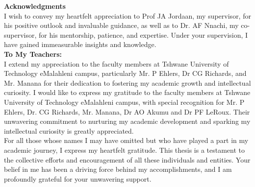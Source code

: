 \textbf{Acknowledgments}
\vspace{0.2cm}
\\I wish to convey my heartfelt appreciation to Prof JA Jordaan, my supervisor, for his positive outlook and invaluable guidance, as well as to Dr. AF Nnachi, my co-supervisor, for his mentorship, patience, and expertise. Under your supervision, I have gained immeasurable insights and knowledge.
\vspace{0.2cm}
\textbf{\\To My Teachers:} 
\vspace{0.2cm}
\\I extend my appreciation to the faculty members at Tshwane University of Technology eMalahleni campus, particularly Mr. P Ehlers, Dr CG Richards, and Mr. Manana for their dedication to fostering my academic growth and intellectual curiosity.
I would like to express my gratitude to the faculty members at Tshwane University of Technology eMalahleni campus, with special recognition for Mr. P Ehlers, Dr. CG Richards, Mr. Manana, Dr AO Akumu and Dr PF LeRoux. Their unwavering commitment to nurturing my academic development and sparking my intellectual curiosity is greatly appreciated.
\vspace{0.2cm}
\\For all those whose names I may have omitted but who have played a part in my academic journey, I express my heartfelt gratitude.
This thesis is a testament to the collective efforts and encouragement of all these individuals and entities. Your belief in me has been a driving force behind my accomplishments, and I am profoundly grateful for your unwavering support.



\vspace{1.8cm}
